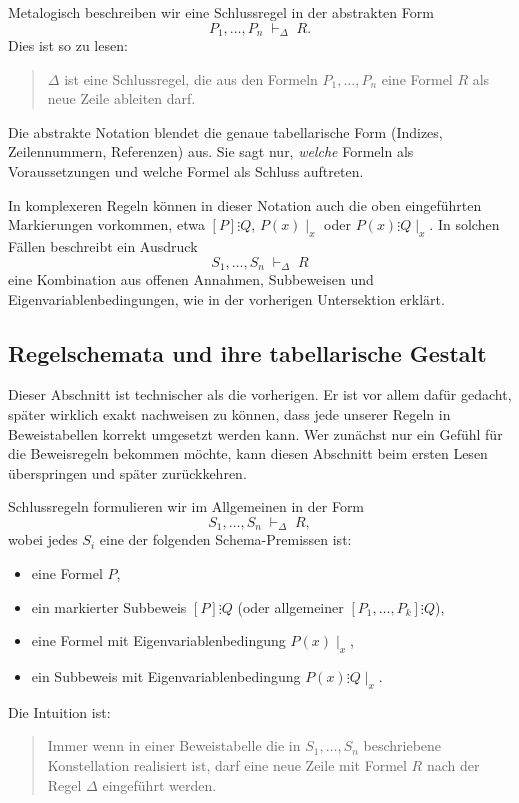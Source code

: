 \documentclass[main.tex]{subfiles}
\begin{document}
Metalogisch beschreiben wir eine Schlussregel in der abstrakten Form
\[
  P_1,\dots,P_n \;\vdash_\Delta\; R.
\]
Dies ist so zu lesen:
\begin{quote}
  \(\Delta\) ist eine Schlussregel, die aus den Formeln
  \(P_1,\dots,P_n\) eine Formel \(R\) als neue Zeile ableiten darf.
\end{quote}
Die abstrakte Notation blendet die genaue tabellarische Form (Indizes,
Zeilennummern, Referenzen) aus. Sie sagt nur, \emph{welche} Formeln als
Voraussetzungen und welche Formel als Schluss auftreten.

In komplexeren Regeln können in dieser Notation auch die oben
eingeführten Markierungen vorkommen, etwa
\([P]\vdots Q\), \(P(x)\mid_x\) oder \(P(x)\vdots Q\mid_x\). In solchen
Fällen beschreibt ein Ausdruck
\[
  S_1,\dots,S_n \;\vdash_\Delta\; R
\]
eine Kombination aus offenen Annahmen, Subbeweisen und
Eigenvariablenbedingungen, wie in der vorherigen Untersektion erklärt.

\subsection{Regelschemata und ihre tabellarische Gestalt}

\begin{remark}
Dieser Abschnitt ist technischer als die vorherigen. Er ist vor
allem dafür gedacht, später wirklich exakt nachweisen zu können,
dass jede unserer Regeln in Beweistabellen korrekt umgesetzt
werden kann. Wer zunächst nur ein Gefühl für die Beweisregeln
bekommen möchte, kann diesen Abschnitt beim ersten Lesen
überspringen und später zurückkehren.
\end{remark}

Schlussregeln formulieren wir im Allgemeinen in der Form
\[
  S_1,\dots,S_n \;\vdash_\Delta\; R,
\]
wobei jedes \(S_i\) eine der folgenden Schema-Premissen ist:
\begin{itemize}
  \item eine Formel \(P\),
  \item ein markierter Subbeweis \([P]\vdots Q\) (oder allgemeiner
        \([P_1,\dots,P_k]\vdots Q\)),
  \item eine Formel mit Eigenvariablenbedingung \(P(x)\mid_x\),
  \item ein Subbeweis mit Eigenvariablenbedingung \(P(x)\vdots Q\mid_x\).
\end{itemize}

Die Intuition ist:
\begin{quote}
  Immer wenn in einer Beweistabelle die in \(S_1,\dots,S_n\) beschriebene
  Konstellation realisiert ist, darf eine neue Zeile mit Formel \(R\)
  nach der Regel \(\Delta\) eingeführt werden.
\end{quote}
\end{document}
